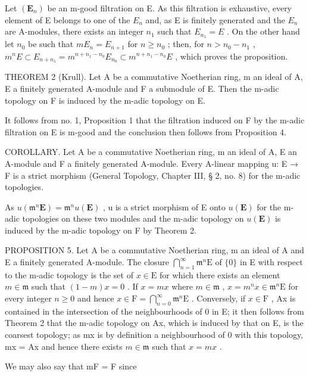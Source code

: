 Let \((\mathbf{E}_{n})\) be an m-good filtration on E. As this filtration is exhaustive, every element of E belongs to one of the \(E_{n}\) and, as E is finitely generated and the \(E_{n}\) are A-modules, there exists an integer \(n_{1}\) such that \(E_{n_{1}} = E\) . On the other hand let \(n_{0}\) be such that \(mE_{n} = E_{n+1}\) for \(n \geqslant n_{0}\) ; then, for \(n > n_{0} - n_{1}\) , \(m^{n}E \subset E_{n+n_{1}} = m^{n+n_{1}-n_{0}}E_{n_{0}} \subset m^{n+n_{1}-n_{0}}E\) , which proves the proposition.

THEOREM 2 (Krull). Let A be a commutative Noetherian ring, m an ideal of A, E a finitely generated A-module and F a submodule of E. Then the m-adic topology on F is induced by the m-adic topology on E.

It follows from no. 1, Proposition 1 that the filtration induced on F by the m-adic filtration on E is m-good and the conclusion then follows from Proposition 4.

COROLLARY. Let A be a commutative Noetherian ring, m an ideal of A, E an A-module and F a finitely generated A-module. Every A-linear mapping u: E → F is a strict morphism (General Topology, Chapter III, § 2, no. 8) for the m-adic topologies.

As \(u(\mathfrak{m}^{n}\mathbf{E}) = \mathfrak{m}^{n}u(\mathbf{E})\) , u is a strict morphism of E onto \(u(\mathbf{E})\) for the m-adic topologies on these two modules and the m-adic topology on \(u(\mathbf{E})\) is induced by the m-adic topology on F by Theorem 2.

PROPOSITION 5. Let A be a commutative Noetherian ring, m an ideal of A and E a finitely generated A-module. The closure \(\bigcap_{n=1}^{\infty} \mathfrak{m}^{n}\mathrm{E}\) of \(\{0\}\) in E with respect to the m-adic topology is the set of \(x \in \mathrm{E}\) for which there exists an element \(m \in \mathfrak{m}\) such that \((1 - m)x = 0\) . If \(x = mx\) where \(m \in \mathfrak{m}\) , \(x = m^{n}x \in \mathfrak{m}^{n}\mathrm{E}\) for every integer \(n \geqslant 0\) and hence \(x \in \mathrm{F} = \bigcap_{n=0}^{\infty} \mathfrak{m}^{n}\mathrm{E}\) . Conversely, if \(x \in \mathrm{F}\) , Ax is contained in the intersection of the neighbourhoods of 0 in E; it then follows from Theorem 2 that the m-adic topology on Ax, which is induced by that on E, is the coarsest topology; as mx is by definition a neighbourhood of 0 with this topology, mx = Ax and hence there exists \(m \in \mathfrak{m}\) such that \(x = mx\) .

We may also say that mF = F since

